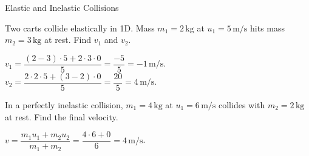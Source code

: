\begin{KnowledgePoint}{Elastic and Inelastic Collisions \Core}
  \KPProblems
\begin{cheatproblem}
  Two carts collide elastically in 1D. Mass $m_1=2\,\text{kg}$ at $u_1=5\,\text{m/s}$ hits mass $m_2=3\,\text{kg}$ at rest. Find $v_1$ and $v_2$.
\begin{solutionbox}
  $v_1=\dfrac{(2-3)\cdot5+2\cdot3\cdot0}{5}=\dfrac{-5}{5}=-1\,\text{m/s}$. $v_2=\dfrac{2\cdot2\cdot5+(3-2)\cdot0}{5}=\dfrac{20}{5}=4\,\text{m/s}$.
\end{solutionbox}
\end{cheatproblem}
\begin{cheatproblem}
  In a perfectly inelastic collision, $m_1=4\,\text{kg}$ at $u_1=6\,\text{m/s}$ collides with $m_2=2\,\text{kg}$ at rest. Find the final velocity.
\begin{solutionbox}
  $v=\dfrac{m_1u_1+m_2u_2}{m_1+m_2}=\dfrac{4\cdot6+0}{6}=4\,\text{m/s}$.
\end{solutionbox}
\end{cheatproblem}
\end{KnowledgePoint}

